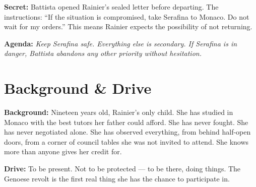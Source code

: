 \clearpage
\begin{secretbox}
\textbf{Secret:} Battista opened Rainier's sealed letter before departing. The
instructions: ``If the situation is compromised, take Serafina to Monaco.
Do not wait for my orders.'' This means Rainier expects the possibility of not
returning.

\medskip\noindent\textcolor{SecretRed}{\textbf{Agenda:}} \textit{Keep Serafina safe.
Everything else is secondary. If Serafina is in danger, Battista abandons any other
priority without hesitation.}
\end{secretbox}

\clearpage


\section*{Background \& Drive}
\begin{rulebox}{}
\textbf{Background:} Nineteen years old, Rainier's only child. She has studied in
Monaco with the best tutors her father could afford. She has never fought. She has
never negotiated alone. She has observed everything, from behind half-open doors,
from a corner of council tables she was not invited to attend. She knows more than
anyone gives her credit for.

\medskip\noindent\textcolor{GrimaldiPurple}{\textbf{Drive:}} To be present. Not to
be protected --- to be there, doing things. The Genoese revolt is the first real
thing she has the chance to participate in.
\end{rulebox}

